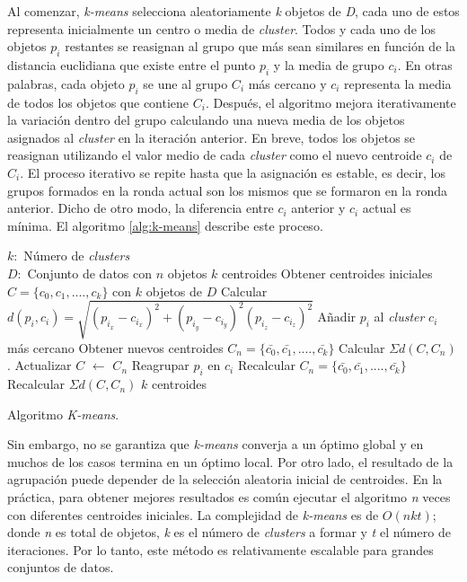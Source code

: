 Al comenzar, \textit{k-means} selecciona aleatoriamente \textit{k} objetos de \textit{D}, cada uno de estos representa inicialmente un centro o media de \textit{cluster}. Todos y cada uno de los objetos $p_i$ restantes se reasignan al grupo que más sean similares en función de la distancia euclidiana que existe entre el punto $p_i$ y la media de grupo $c_i$. En otras palabras, cada objeto $p_i$ se une al grupo $C_i$ más cercano y $c_i$ representa la media de todos los objetos que contiene $C_i$. Después, el algoritmo mejora iterativamente la variación dentro del grupo calculando una nueva media de los objetos asignados al \textit{cluster} en la iteración anterior. En breve, todos los objetos se reasignan utilizando el valor medio de cada \textit{cluster} como el nuevo centroide $c_i$ de $C_i$. El proceso iterativo se repite hasta que la asignación es estable, es decir, los grupos formados en la ronda actual son los mismos que se formaron en la ronda anterior. Dicho de otro modo, la diferencia entre $c_i$ anterior y $c_i$ actual es mínima. El algoritmo \ref{alg:k-means} describe este proceso.
\begin{algorithm}
    \begin{algorithmic}[0]
        \REQUIRE $k:$ Número de \textit{clusters} \\ \parindent=12.5mm $D:$ Conjunto de datos con $n$ objetos
        \ENSURE $k$ centroides
        \STATE Obtener centroides iniciales $C = \{c_0, c_1, .... , c_k\}$ con $k$ objetos de $D$
            \STATE Calcular $d(p_i, c_i) = \sqrt{(p_{i_{x}} - c_{i_{x}})^2 + (p_{i_{y}} - c_{i_{y}})^2 (p_{i_{z}} - c_{i_{z}})^2}$
            \STATE Añadir $p_i$ al \textit{cluster} $c_i$ más cercano
        \ENDFOR
        \STATE Obtener nuevos centroides $C_n = \{\bar{c_0}, \bar{c_1}, .... , \bar{c_k}\}$
        \STATE Calcular $\Sigma d(C, C_n)$.
            \STATE Actualizar $C$ $\leftarrow$ $C_n$
            \STATE Reagrupar $p_i$ en $c_i$
            \STATE Recalcular $C_n = \{\bar{c_0}, \bar{c_1}, .... , \bar{c_k}\}$
            \STATE Recalcular $\Sigma d(C, C_n)$
        \ENDWHILE
        \RETURN $k$ centroides
    \end{algorithmic} 
  
    \caption{Algoritmo \textit{K-means}.}
    \label{alg:k-means}
\end{algorithm}

Sin embargo, no se garantiza que \textit{k-means} converja a un óptimo global y en muchos de los casos termina en un óptimo local. Por otro lado, el resultado de la agrupación puede depender de la selección aleatoria inicial de centroides. En la práctica, para obtener mejores resultados es común ejecutar el algoritmo \textit{n} veces con diferentes centroides iniciales. La complejidad de \textit{k-means} es de $O(nkt)$; donde \textit{n} es total de objetos, \textit{k} es el número de \textit{clusters} a formar y \textit{t} el número de iteraciones. Por lo tanto, este método es relativamente escalable para grandes conjuntos de datos.


